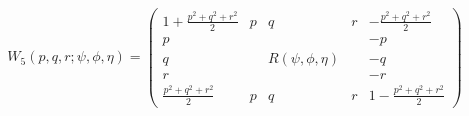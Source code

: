\begin{equation}
W_5(p,q,r; \psi, \phi, \eta) =
\left( \begin{array}{ccccc}
1+ \frac{p^2 + q^2 + r^2}{2} & p & q & r & -\frac{p^2 + q^2 + r^2}{2} \\
p & & & & -p \\
q & &R(\psi, \phi, \eta) & & -q \\
r & & & & -r  \\
\frac{p^2 + q^2 + r^2}{2} &  p & q & r & 1 -\frac{p^2 + q^2 + r^2}{2}
\end{array}\right)
\label{88}
\end{equation}

